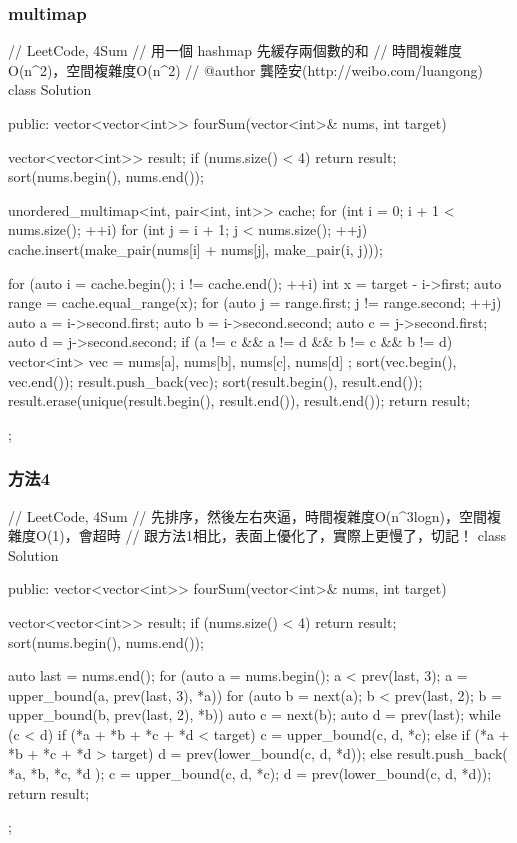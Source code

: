 \subsubsection{multimap}
\begin{Code}
// LeetCode, 4Sum
// 用一個 hashmap 先緩存兩個數的和
// 時間複雜度O(n^2)，空間複雜度O(n^2)
// @author 龔陸安(http://weibo.com/luangong)
class Solution {
public:
    vector<vector<int>> fourSum(vector<int>& nums, int target) {
        vector<vector<int>> result;
        if (nums.size() < 4) return result;
        sort(nums.begin(), nums.end());

        unordered_multimap<int, pair<int, int>> cache;
        for (int i = 0; i + 1 < nums.size(); ++i)
            for (int j = i + 1; j < nums.size(); ++j)
                cache.insert(make_pair(nums[i] + nums[j], make_pair(i, j)));

        for (auto i = cache.begin(); i != cache.end(); ++i) {
            int x = target - i->first;
            auto range = cache.equal_range(x);
            for (auto j = range.first; j != range.second; ++j) {
                auto a = i->second.first;
                auto b = i->second.second;
                auto c = j->second.first;
                auto d = j->second.second;
                if (a != c && a != d && b != c && b != d) {
                    vector<int> vec = { nums[a], nums[b], nums[c], nums[d] };
                    sort(vec.begin(), vec.end());
                    result.push_back(vec);
                }
            }
        }
        sort(result.begin(), result.end());
        result.erase(unique(result.begin(), result.end()), result.end());
        return result;
    }
};
\end{Code}


\subsubsection{方法4}
\begin{Code}
// LeetCode, 4Sum
// 先排序，然後左右夾逼，時間複雜度O(n^3logn)，空間複雜度O(1)，會超時
// 跟方法1相比，表面上優化了，實際上更慢了，切記！
class Solution {
public:
    vector<vector<int>> fourSum(vector<int>& nums, int target) {
        vector<vector<int>> result;
        if (nums.size() < 4) return result;
        sort(nums.begin(), nums.end());

        auto last = nums.end();
        for (auto a = nums.begin(); a < prev(last, 3);
                a = upper_bound(a, prev(last, 3), *a)) {
            for (auto b = next(a); b < prev(last, 2);
                    b = upper_bound(b, prev(last, 2), *b)) {
                auto c = next(b);
                auto d = prev(last);
                while (c < d) {
                    if (*a + *b + *c + *d < target) {
                        c = upper_bound(c, d, *c);
                    } else if (*a + *b + *c + *d > target) {
                        d = prev(lower_bound(c, d, *d));
                    } else {
                        result.push_back({ *a, *b, *c, *d });
                        c = upper_bound(c, d, *c);
                        d = prev(lower_bound(c, d, *d));
                    }
                }
            }
        }
        return result;
    }
};
\end{Code}


